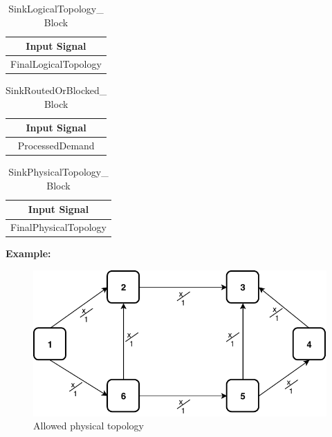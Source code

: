 \begin{table}[H]
	\centering
	\begin{tabular}{| c |}
		\hline
		\textbf{Input Signal}\\ \hline
		FinalLogicalTopology \\ \hline
	\end{tabular}
	\caption{SinkLogicalTopology\_ Block}
	\label{sink_logical_topology_block}
\end{table}

\begin{table}[H]
	\centering
	\begin{tabular}{| c |}
		\hline
		\textbf{Input Signal}\\ \hline
		ProcessedDemand \\ \hline
	\end{tabular}
	\caption{SinkRoutedOrBlocked\_ Block}
	\label{sink_routed_or_blocked_block}
\end{table}

\begin{table}[H]
	\centering
	\begin{tabular}{| c |}
		\hline
		\textbf{Input Signal}\\ \hline
		FinalPhysicalTopology \\ \hline
	\end{tabular}
	\caption{SinkPhysicalTopology\_ Block}
	\label{sink_physical_topology_block}
\end{table}


\newpage
\vspace{11pt}

\textbf{Example:}

\begin{figure}[h!]
	\centering
	\includegraphics[width=13cm]{sdf/heuristic/opaque/figures/allowed_physical_ex}
	\caption{Allowed physical topology}
	\label{allowed_physical_ex}
\end{figure}


